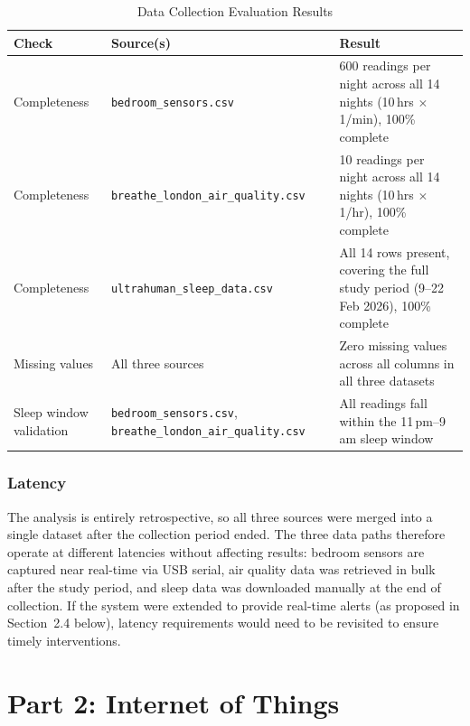 \documentclass[10pt,a4paper]{extarticle}
\begin{document}
\begin{table}[H]
\centering
\caption{Data Collection Evaluation Results}
\label{tab:eval-checks}
\scriptsize
\begin{tabularx}{\textwidth}{p{3.6cm} p{5.0cm} X}
\toprule
\textbf{Check} & \textbf{Source(s)} & \textbf{Result} \\
\midrule
Completeness & \texttt{bedroom\_sensors.csv} & 600 readings per night across all 14 nights (10\,hrs $\times$ 1/min), 100\% complete \\
\midrule
Completeness & \texttt{breathe\_london\_air\_quality.csv} & 10 readings per night across all 14 nights (10\,hrs $\times$ 1/hr), 100\% complete \\
\midrule
Completeness & \texttt{ultrahuman\_sleep\_data.csv} & All 14 rows present, covering the full study period (9--22 Feb 2026), 100\% complete \\
\midrule
Missing values & All three sources & Zero missing values across all columns in all three datasets \\
\midrule
Sleep window validation & \texttt{bedroom\_sensors.csv}, \texttt{breathe\_london\_air\_quality.csv} & All readings fall within the 11\,pm--9\,am sleep window \\
\bottomrule
\end{tabularx}
\end{table}

\subsubsection{Latency}

The analysis is entirely retrospective, so all three sources were merged into a single dataset after the collection period ended. The three data paths therefore operate at different latencies without affecting results: bedroom sensors are captured near real-time via USB serial, air quality data was retrieved in bulk after the study period, and sleep data was downloaded manually at the end of collection. If the system were extended to provide real-time alerts (as proposed in Section~2.4 below), latency requirements would need to be revisited to ensure timely interventions.

\section*{Part 2: Internet of Things}
\setcounter{section}{2}
\setcounter{subsection}{0}
\end{document}
